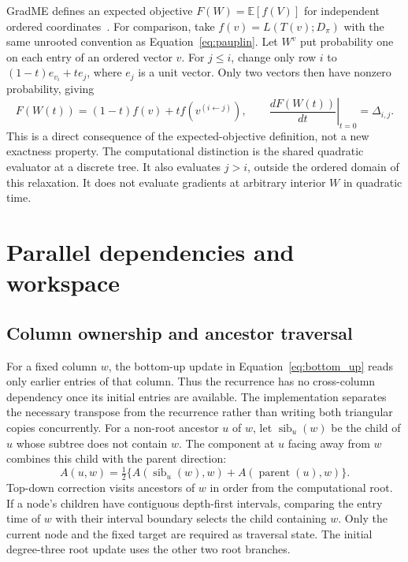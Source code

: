GradME defines an expected objective $F(W)=\mathbb E[f(V)]$ for independent ordered coordinates~\cite{penn2023gradme}.
For comparison, take $f(v)=L(T(v);D_\pi)$ with the same unrooted convention as Equation~\eqref{eq:pauplin}.
Let $W^v$ put probability one on each entry of an ordered vector $v$.
For $j\leq i$, change only row $i$ to $(1-t)e_{v_i}+t e_j$, where $e_j$ is a unit vector.
Only two vectors then have nonzero probability, giving
\begin{equation}
 F(W(t))=(1-t)f(v)+t f(v^{(i\leftarrow j)}),\qquad
 \left.\frac{dF(W(t))}{dt}\right|_{t=0}=\Delta_{i,j}.
 \label{eq:vertex_gradient}
\end{equation}
This is a direct consequence of the expected-objective definition, not a new exactness property.
The computational distinction is the shared quadratic evaluator at a discrete tree.
It also evaluates $j>i$, outside the ordered domain of this relaxation.
It does not evaluate gradients at arbitrary interior $W$ in quadratic time.

\section{Parallel dependencies and workspace}
\label{sec:parallel_details}

\subsection{Column ownership and ancestor traversal}

For a fixed column $w$, the bottom-up update in Equation~\eqref{eq:bottom_up} reads only earlier entries of that column.
Thus the recurrence has no cross-column dependency once its initial entries are available.
The implementation separates the necessary transpose from the recurrence rather than writing both triangular copies concurrently.
For a non-root ancestor $u$ of $w$, let $\operatorname{sib}_u(w)$ be the child of $u$ whose subtree does not contain $w$.
The component at $u$ facing away from $w$ combines this child with the parent direction:
\begin{equation}
 A(u,w)=\tfrac12\{A(\operatorname{sib}_u(w),w)
                         +A(\operatorname{parent}(u),w)\}.
 \label{eq:top_down}
\end{equation}
Top-down correction visits ancestors of $w$ in order from the computational root.
If a node's children have contiguous depth-first intervals, comparing the entry time of $w$ with their interval boundary selects the child containing $w$.
Only the current node and the fixed target are required as traversal state.
The initial degree-three root update uses the other two root branches.

